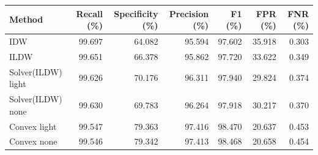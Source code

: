 \begin{tabular}{lrrrrrr}\toprule
Method & Recall (\%) & Specificity (\%) & Precision (\%) & F1 (\%) & FPR (\%) & FNR (\%) \\ \midrule
IDW & 99.697 & 64.082 & 95.594 & 97.602 & 35.918 & 0.303 \\
ILDW & 99.651 & 66.378 & 95.862 & 97.720 & 33.622 & 0.349 \\
Solver(ILDW) light & 99.626 & 70.176 & 96.311 & 97.940 & 29.824 & 0.374 \\
Solver(ILDW) none & 99.630 & 69.783 & 96.264 & 97.918 & 30.217 & 0.370 \\
Convex light & 99.547 & 79.363 & 97.416 & 98.470 & 20.637 & 0.453 \\
Convex none & 99.546 & 79.342 & 97.413 & 98.468 & 20.658 & 0.454 \\
\bottomrule\end{tabular}
